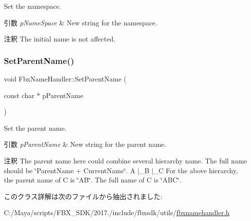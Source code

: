 Set the namespace. 
\begin{DoxyParams}{引数}
{\em p\+Name\+Space} & New string for the namespace. \\
\hline
\end{DoxyParams}
\begin{DoxyRemark}{注釈}
The initial name is not affected. 
\end{DoxyRemark}
\mbox{\label{class_fbx_name_handler_a647b1b11442049cebf1e958fcc523608}} 
\subsubsection{\texorpdfstring{Set\+Parent\+Name()}{SetParentName()}}
{\footnotesize\ttfamily void Fbx\+Name\+Handler\+::\+Set\+Parent\+Name (\begin{DoxyParamCaption}\item[{const char $\ast$}]{p\+Parent\+Name }\end{DoxyParamCaption})}

Set the parent name. 
\begin{DoxyParams}{引数}
{\em p\+Parent\+Name} & New string for the parent name. \\
\hline
\end{DoxyParams}
\begin{DoxyRemark}{注釈}
The parent name here could combine several hierarchy name. The full name should be \char`\"{}\+Parent\+Name + Current\+Name\char`\"{}. A $\vert$\+\_\+B $\vert$\+\_\+C For the above hierarchy, the parent name of C is \char`\"{}\+A\+B\char`\"{}. The full name of C is \char`\"{}\+A\+B\+C\char`\"{}. 
\end{DoxyRemark}


このクラス詳解は次のファイルから抽出されました\+:\begin{DoxyCompactItemize}
\item 
C\+:/\+Maya/scripts/\+F\+B\+X\+\_\+\+S\+D\+K/2017./include/fbxsdk/utils/\hyperlink{fbxnamehandler_8h}{fbxnamehandler.\+h}\end{DoxyCompactItemize}
